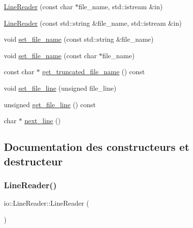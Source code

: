 \begin{DoxyCompactItemize}
\hyperlink{classio_1_1LineReader_a301c08eb9ca5d3fdccf4e9a8e5ac82f8}{Line\+Reader} (const char $\ast$file\+\_\+name, std\+::istream \&in)
\item 
\hyperlink{classio_1_1LineReader_a3eacf4d1539a24122c6897fce4e72f06}{Line\+Reader} (const std\+::string \&file\+\_\+name, std\+::istream \&in)
\item 
void \hyperlink{classio_1_1LineReader_a1a0763d491dec16cebc33134e965dfee}{set\+\_\+file\+\_\+name} (const std\+::string \&file\+\_\+name)
\item 
void \hyperlink{classio_1_1LineReader_a81c56ac68497da5ec874333ce063fd83}{set\+\_\+file\+\_\+name} (const char $\ast$file\+\_\+name)
\item 
const char $\ast$ \hyperlink{classio_1_1LineReader_ad5817da6af1ae77daddec7aeaeebf2f8}{get\+\_\+truncated\+\_\+file\+\_\+name} () const
\item 
void \hyperlink{classio_1_1LineReader_a581b55d4ced6adb964de50fa8ac6eb08}{set\+\_\+file\+\_\+line} (unsigned file\+\_\+line)
\item 
unsigned \hyperlink{classio_1_1LineReader_a3f3459e22ed8e459238c290050b6722e}{get\+\_\+file\+\_\+line} () const
\item 
char $\ast$ \hyperlink{classio_1_1LineReader_a97f4e0129611d9da2b8c966ffe670be5}{next\+\_\+line} ()
\end{DoxyCompactItemize}


\subsection{Documentation des constructeurs et destructeur}
\mbox{\label{classio_1_1LineReader_abd9f13fb1d3f5d36857dec0a1d1bde6c}} 
\subsubsection{\texorpdfstring{Line\+Reader()}{LineReader()}\hspace{0.1cm}{\footnotesize\ttfamily [1/12]}}
{\footnotesize\ttfamily io\+::\+Line\+Reader\+::\+Line\+Reader (\begin{DoxyParamCaption}{ }\end{DoxyParamCaption})\hspace{0.3cm}{\ttfamily [delete]}}

\mbox{\label{classio_1_1LineReader_a84f2957de769bb701eaaddfd8bc004dd}} 
